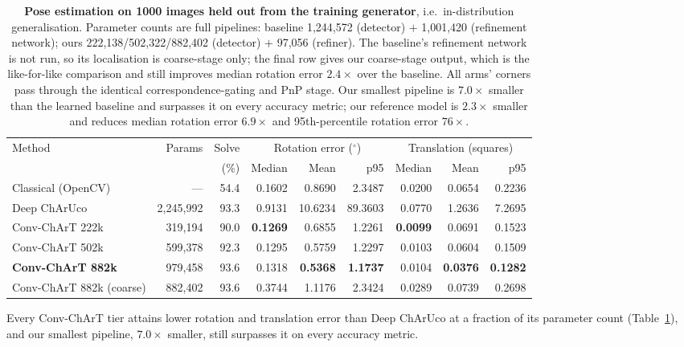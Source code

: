 \documentclass[10pt,twocolumn,letterpaper]{article}
\newcommand{\dgr}{$^\circ$}
\begin{document}
\begin{table}[t]
\centering\small
\begin{tabular}{lrrrrrrrr}
\toprule
Method & Params & Solve &
\multicolumn{3}{c}{Rotation error (\dgr)} & \multicolumn{3}{c}{Translation (squares)} \\
\cmidrule(lr){4-6}\cmidrule(lr){7-9}
 & & (\%) & Median & Mean & p95 & Median & Mean & p95 \\
\midrule
Classical (OpenCV) & --- & 54.4 & 0.1602 & 0.8690 & 2.3487 & 0.0200 & 0.0654 & 0.2236 \\
Deep ChArUco~\cite{hu2019} & 2,245,992 & 93.3 & 0.9131 & 10.6234 & 89.3603 & 0.0770 & 1.2636 & 7.2695 \\
\midrule
Conv-ChArT 222k & 319,194 & 90.0 & \textbf{0.1269} & 0.6855 & 1.2261 & \textbf{0.0099} & 0.0691 & 0.1523 \\
Conv-ChArT 502k & 599,378 & 92.3 & 0.1295 & 0.5759 & 1.2297 & 0.0103 & 0.0604 & 0.1509 \\
\textbf{Conv-ChArT 882k} & 979,458 & 93.6 & 0.1318 & \textbf{0.5368} & \textbf{1.1737} & 0.0104 & \textbf{0.0376} & \textbf{0.1282} \\
\midrule
Conv-ChArT 882k (coarse) & 882,402 & 93.6 & 0.3744 & 1.1176 & 2.3424 & 0.0289 & 0.0739 & 0.2698 \\
\bottomrule
\end{tabular}
\caption{\textbf{Pose estimation on 1000 images held out from the training generator}, i.e.\
in-distribution generalisation. Parameter counts are full pipelines: baseline 1,244,572 (detector)
$+$ 1,001,420 (refinement network); ours 222,138/502,322/882,402 (detector) $+$ 97,056 (refiner).
The baseline's refinement network is not run, so its localisation is coarse-stage only; the final
row gives our coarse-stage output, which is the like-for-like comparison and still improves median
rotation error $2.4\times$ over the baseline. All arms' corners pass through the identical
correspondence-gating and PnP stage. Our smallest pipeline is $7.0\times$ smaller than the learned
baseline and surpasses it on every accuracy metric; our reference model is $2.3\times$ smaller and
reduces median rotation error $6.9\times$ and 95th-percentile rotation error $76\times$.}
\label{tab:pose}
\end{table}

Every Conv-ChArT tier attains lower rotation and translation error than Deep ChArUco at a fraction
of its parameter count (Table~\ref{tab:pose}), and our smallest pipeline, $7.0\times$ smaller,
still surpasses it on every accuracy metric.
\end{document}
